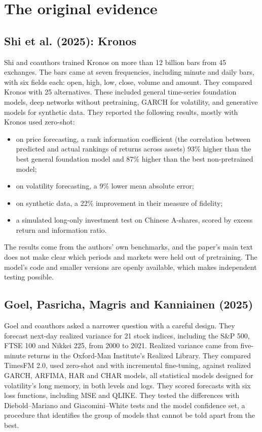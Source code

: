 \section{The original evidence}
\label{sec:23-evidence}

\subsection{Shi et al. (2025): Kronos}

Shi and coauthors trained Kronos on more than 12 billion bars from 45 exchanges. The bars came at seven frequencies, including minute and daily bars, with six fields each: open, high, low, close, volume and amount. They compared Kronos with 25 alternatives. These included general time-series foundation models, deep networks without pretraining, GARCH for volatility, and generative models for synthetic data. They reported the following results, mostly with Kronos used zero-shot:

\begin{itemize}
  \item on price forecasting, a rank information coefficient (the correlation between predicted and actual rankings of returns across assets) 93\% higher than the best general foundation model and 87\% higher than the best non-pretrained model;
  \item on volatility forecasting, a 9\% lower mean absolute error;
  \item on synthetic data, a 22\% improvement in their measure of fidelity;
  \item a simulated long-only investment test on Chinese A-shares, scored by excess return and information ratio.
\end{itemize}

The results come from the authors' own benchmarks, and the paper's main text does not make clear which periods and markets were held out of pretraining. The model's code and smaller versions are openly available, which makes independent testing possible.

\subsection{Goel, Pasricha, Magris and Kanniainen (2025)}

Goel and coauthors asked a narrower question with a careful design. They forecast next-day realized variance for 21 stock indices, including the S\&P 500, FTSE 100 and Nikkei 225, from 2000 to 2021. Realized variance came from five-minute returns in the Oxford-Man Institute's Realized Library. They compared TimesFM 2.0, used zero-shot and with incremental fine-tuning, against realized GARCH, ARFIMA, HAR and CHAR models, all statistical models designed for volatility's long memory, in both levels and logs. They scored forecasts with six loss functions, including MSE and QLIKE. They tested the differences with Diebold--Mariano and Giacomini--White tests and the model confidence set, a procedure that identifies the group of models that cannot be told apart from the best.

